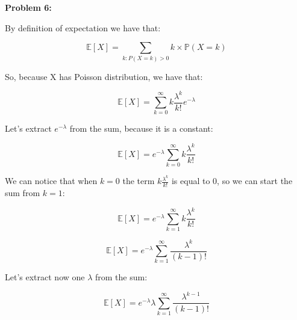 \textbf{Problem 6:}

\singlespacing

By definition of expectation we have that:

\singlespacing

\begin{equation}
    \mathbb{E}[X] = \sum_{k: P(X = k) > 0} k \times \mathbb{P}(X = k)
\end{equation}

\singlespacing

So, because X has Poisson distribution, we have that:

\singlespacing

\begin{equation}
    \mathbb{E}[X] = \sum_{k=0}^{\infty} k \frac{\lambda^k}{k!}e^{-\lambda}
\end{equation}

\singlespacing

Let's extract $e^{-\lambda}$ from the sum, because it is a constant:

\singlespacing

\begin{equation}
    \mathbb{E}[X] = e^{-\lambda} \sum_{k=0}^{\infty} k \frac{\lambda^k}{k!}
\end{equation}

\singlespacing

We can notice that when $k = 0$ the term $k \frac{\lambda^k}{k!}$ is equal to $0$,
so we can start the sum from $k = 1$:

\singlespacing

\begin{equation}
    \mathbb{E}[X] = e^{-\lambda} \sum_{k=1}^{\infty} k \frac{\lambda^k}{k!}
\end{equation}

\singlespacing

\begin{equation}
    \mathbb{E}[X] = e^{-\lambda} \sum_{k=1}^{\infty} \frac{\lambda^k}{(k-1)!}
\end{equation}

\singlespacing

Let's extract now one $\lambda$ from the sum:

\singlespacing

\begin{equation}
    \mathbb{E}[X] = e^{-\lambda} \lambda \sum_{k=1}^{\infty} \frac{\lambda^{k-1}}{(k-1)!}
\end{equation}

\singlespacing

